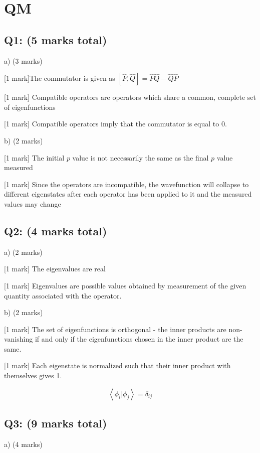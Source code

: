 \documentclass[a4paper,11pt]{article}
\begin{document}
\section{QM}

\subsection*{Q1: (5 marks total)}

a) (3 marks)

[1 mark]The commutator is given as  \( \left[\hat{P}, \hat{Q} \right] = \hat{P}\hat{Q} - \hat{Q}\hat{P} \)

[1 mark] Compatible operators are operators which share a common, complete set of eigenfunctions

[1 mark] Compatible operators imply that the commutator is equal to 0.

b) (2 marks)

[1 mark] The initial \( p \) value is not necessarily the same as the final \( p \) value measured

[1 mark] Since the operators are incompatible, the wavefunction will collapse to different eigenstates after each operator has been applied to it and the measured values may change

\subsection*{Q2: (4 marks total)}

a) (2 marks)

[1 mark] The eigenvalues are real 

[1 mark] Eigenvalues are possible values obtained by measurement of the given quantity associated with the operator. 

b) (2 marks)

[1 mark] The set of eigenfunctions is orthogonal - the inner products are non-vanishing if and only if the eigenfunctions chosen in the inner product are the same. 

[1 mark] Each eigenstate is normalized such that their inner product with themselves gives 1. 

\[ \left< \phi_i | \phi_j \right> = \delta_{ij} \]

\subsection*{Q3: (9 marks total)}

a) (4 marks)
\end{document}
